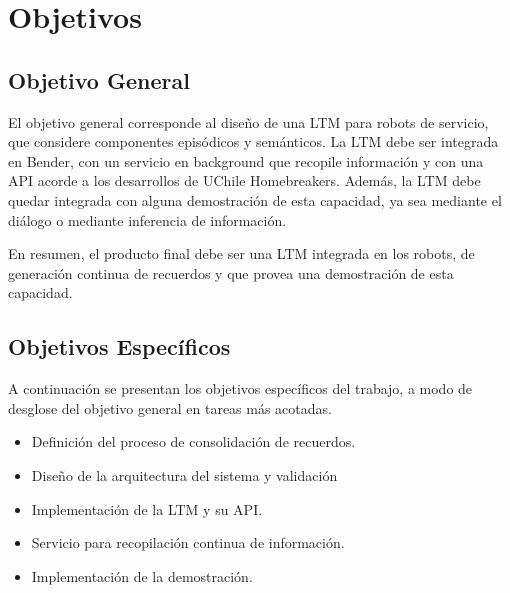 


\section{Objetivos}

\subsection{Objetivo General}


El objetivo general corresponde al dise\~no de una LTM para robots de servicio, que considere componentes epis\'odicos y sem\'anticos. La LTM debe ser integrada en Bender, con un servicio en background que recopile informaci\'on y con una API acorde a los desarrollos de UChile Homebreakers. Adem\'as, la LTM debe quedar integrada con alguna demostraci\'on de esta capacidad, ya sea mediante el di\'alogo o mediante inferencia de informaci\'on.

En resumen, el producto final debe ser una LTM integrada en los robots, de generaci\'on continua de recuerdos y que provea una demostraci\'on de esta capacidad.


\subsection{Objetivos Espec\'ificos}

A continuaci\'on se presentan los objetivos espec\'ificos del trabajo, a modo de desglose del objetivo general en tareas m\'as acotadas.

\begin{itemize}
\item Definici\'on del proceso de consolidaci\'on de recuerdos.
\item Dise\~no de la arquitectura del sistema y validaci\'on
\item Implementaci\'on de la LTM y su API.
\item Servicio para recopilaci\'on continua de informaci\'on.
\item Implementaci\'on de la demostraci\'on.
\end{itemize}

